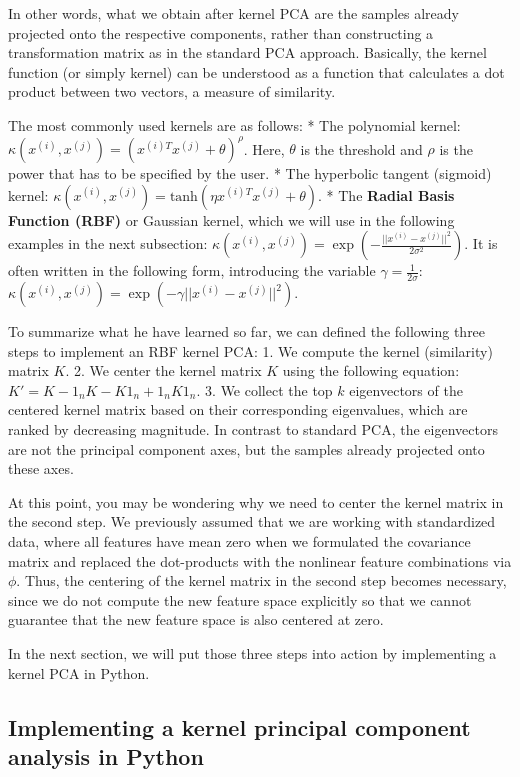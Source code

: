 \documentclass[11pt]{article}
\begin{document}
In other words, what we obtain after kernel PCA are the samples already
projected onto the respective components, rather than constructing a
transformation matrix as in the standard PCA approach. Basically, the
kernel function (or simply kernel) can be understood as a function that
calculates a dot product between two vectors, a measure of similarity.

The most commonly used kernels are as follows: * The polynomial kernel:
\(\kappa(x^{(i)}, x^{(j)}) = (x^{(i)T} x^{(j)} + \theta)^\rho\). Here,
\(\theta\) is the threshold and \(\rho\) is the power that has to be
specified by the user. * The hyperbolic tangent (sigmoid) kernel:
\(\kappa(x^{(i)}, x^{(j)}) = \text{tanh}(\eta x^{(i)T} x^{(j)} + \theta)\).
* The \textbf{Radial Basis Function (RBF)} or Gaussian kernel, which we
will use in the following examples in the next subsection:
\(\kappa(x^{(i)}, x^{(j)}) = \exp \left( -\frac{||x^{(i)} - x^{(j)}||^2}{2\sigma^2} \right)\).
It is often written in the following form, introducing the variable
\(\gamma = \frac{1}{2\sigma}\):
\(\kappa(x^{(i)}, x^{(j)}) = \exp \left( -\gamma ||x^{(i)} - x^{(j)}||^2 \right)\).

    To summarize what he have learned so far, we can defined the following
three steps to implement an RBF kernel PCA: 1. We compute the kernel
(similarity) matrix \(K\). 2. We center the kernel matrix \(K\) using
the following equation: \(K' = K - 1_nK - K1_n + 1_nK 1_n\). 3. We
collect the top \(k\) eigenvectors of the centered kernel matrix based
on their corresponding eigenvalues, which are ranked by decreasing
magnitude. In contrast to standard PCA, the eigenvectors are not the
principal component axes, but the samples already projected onto these
axes.

At this point, you may be wondering why we need to center the kernel
matrix in the second step. We previously assumed that we are working
with standardized data, where all features have mean zero when we
formulated the covariance matrix and replaced the dot-products with the
nonlinear feature combinations via \(\phi\). Thus, the centering of the
kernel matrix in the second step becomes necessary, since we do not
compute the new feature space explicitly so that we cannot guarantee
that the new feature space is also centered at zero.

In the next section, we will put those three steps into action by
implementing a kernel PCA in Python.

    \subsection{Implementing a kernel principal component analysis in
Python}\label{implementing-a-kernel-principal-component-analysis-in-python}
\end{document}
